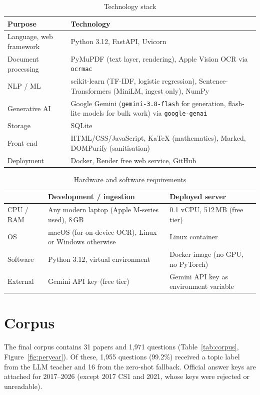 \begin{table}[h]
\centering
\caption{Technology stack}
\label{tab:stack}
\small
\begin{tabularx}{\textwidth}{@{}lX@{}}
\toprule
\textbf{Purpose} & \textbf{Technology}\\
\midrule
Language, web framework & Python 3.12, FastAPI, Uvicorn\\
Document processing & PyMuPDF (text layer, rendering), Apple Vision OCR via \texttt{ocrmac}\\
NLP / ML & scikit-learn (TF-IDF, logistic regression), Sentence-Transformers (MiniLM, ingest only), NumPy\\
Generative AI & Google Gemini (\texttt{gemini-3.8-flash} for generation, flash-lite models for bulk work) via \texttt{google-genai}\\
Storage & SQLite\\
Front end & HTML/CSS/JavaScript, KaTeX (mathematics), Marked, DOMPurify (sanitisation)\\
Deployment & Docker, Render free web service, GitHub\\
\bottomrule
\end{tabularx}
\end{table}

\begin{table}[h]
\centering
\caption{Hardware and software requirements}
\label{tab:req}
\small
\begin{tabularx}{\textwidth}{@{}lXX@{}}
\toprule
& \textbf{Development / ingestion} & \textbf{Deployed server}\\
\midrule
CPU / RAM & Any modern laptop (Apple M-series used), 8\,GB & 0.1 vCPU, 512\,MB (free tier)\\
OS & macOS (for on-device OCR), Linux or Windows otherwise & Linux container\\
Software & Python 3.12, virtual environment & Docker image (no GPU, no PyTorch)\\
External & Gemini API key (free tier) & Gemini API key as environment variable\\
\bottomrule
\end{tabularx}
\end{table}

\section{Corpus}
The final corpus contains 31 papers and 1,971 questions (Table~\ref{tab:corpus}, Figure~\ref{fig:peryear}). Of these,
1,955 questions (99.2\%) received a topic label from the LLM teacher and 16 from the zero-shot fallback. Official
answer keys are attached for 2017--2026 (except 2017 CS1 and 2021, whose keys were rejected or unreadable).

